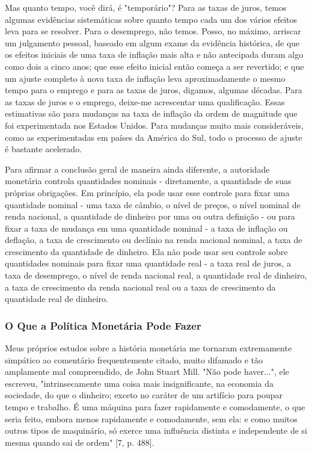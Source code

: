 \documentclass[12pt]{article}
\begin{document}
Mas quanto tempo, você dirá, é "temporário"? Para as taxas de juros, temos algumas evidências sistemáticas sobre quanto tempo cada um dos vários efeitos leva para se resolver. Para o desemprego, não temos. Posso, no máximo, arriscar um julgamento pessoal, baseado em algum exame da evidência histórica, de que os efeitos iniciais de uma taxa de inflação mais alta e não antecipada duram algo como dois a cinco anos; que esse efeito inicial então começa a ser revertido; e que um ajuste completo à nova taxa de inflação leva aproximadamente o mesmo tempo para o emprego e para as taxas de juros, digamos, algumas décadas. Para as taxas de juros e o emprego, deixe-me acrescentar uma qualificação. Essas estimativas são para mudanças na taxa de inflação da ordem de magnitude que foi experimentada nos Estados Unidos. Para mudanças muito mais consideráveis, como as experimentadas em países da América do Sul, todo o processo de ajuste é bastante acelerado.

Para afirmar a conclusão geral de maneira ainda diferente, a autoridade monetária controla quantidades nominais - diretamente, a quantidade de suas próprias obrigações. Em princípio, ela pode usar esse controle para fixar uma quantidade nominal - uma taxa de câmbio, o nível de preços, o nível nominal de renda nacional, a quantidade de dinheiro por uma ou outra definição - ou para fixar a taxa de mudança em uma quantidade nominal - a taxa de inflação ou deflação, a taxa de crescimento ou declínio na renda nacional nominal, a taxa de crescimento da quantidade de dinheiro. Ela não pode usar seu controle sobre quantidades nominais para fixar uma quantidade real - a taxa real de juros, a taxa de desemprego, o nível de renda nacional real, a quantidade real de dinheiro, a taxa de crescimento da renda nacional real ou a taxa de crescimento da quantidade real de dinheiro.

\subsubsection{\textbf{O Que a Política Monetária Pode Fazer}}

Meus próprios estudos sobre a história monetária me tornaram extremamente simpático ao comentário frequentemente citado, muito difamado e tão amplamente mal compreendido, de John Stuart Mill. "Não pode haver...", ele escreveu, "intrinsecamente uma coisa mais insignificante, na economia da sociedade, do que o dinheiro; exceto no caráter de um artifício para poupar tempo e trabalho. É uma máquina para fazer rapidamente e comodamente, o que seria feito, embora menos rapidamente e comodamente, sem ela: e como muitos outros tipos de maquinário, só exerce uma influência distinta e independente de si mesma quando sai de ordem" [7, p. 488].
\end{document}

